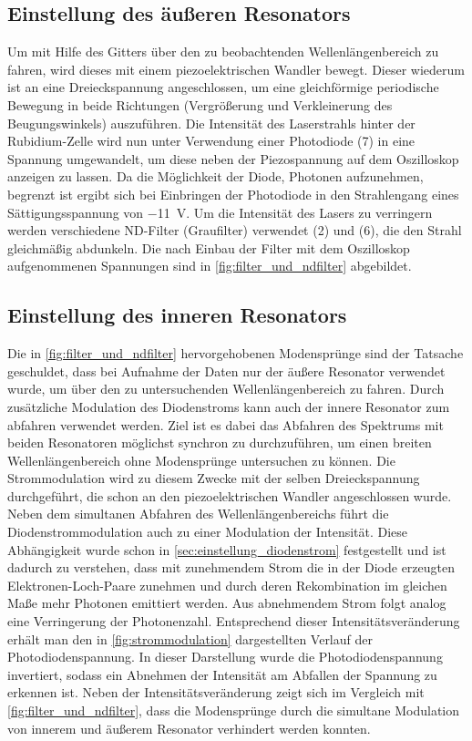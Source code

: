 \subsection{Einstellung des äußeren Resonators}
Um mit Hilfe des Gitters über den zu beobachtenden Wellenlängenbereich zu fahren, wird dieses
mit einem piezoelektrischen Wandler bewegt. Dieser wiederum ist an eine Dreieckspannung angeschlossen,
um eine gleichförmige periodische Bewegung in beide Richtungen (Vergrößerung und Verkleinerung des Beugungswinkels)
auszuführen. 
Die Intensität des Laserstrahls hinter der Rubidium-Zelle wird nun unter Verwendung 
einer Photodiode (7) in eine Spannung 
umgewandelt, um diese neben der Piezospannung auf dem Oszilloskop anzeigen zu lassen. 
Da die Möglichkeit der Diode, Photonen aufzunehmen, begrenzt ist ergibt sich bei Einbringen
der Photodiode in den Strahlengang eines Sättigungsspannung von \SI{-11}{\volt}.
Um die Intensität des Lasers zu verringern werden verschiedene ND-Filter (Graufilter) verwendet
(2) und (6), die den Strahl gleichmäßig abdunkeln. 
Die nach Einbau der Filter mit dem Oszilloskop aufgenommenen Spannungen sind in \cref{fig:filter_und_ndfilter}
abgebildet.

 

\subsection{Einstellung des inneren Resonators} \label{sec:innerer_resonator}
Die in \cref{fig:filter_und_ndfilter} hervorgehobenen Modensprünge sind der Tatsache geschuldet,
dass bei Aufnahme der Daten nur der äußere Resonator verwendet wurde, um über den zu untersuchenden
Wellenlängenbereich zu fahren. Durch zusätzliche Modulation des Diodenstroms kann auch der innere 
Resonator zum abfahren verwendet werden. Ziel ist es dabei das Abfahren des Spektrums mit beiden 
Resonatoren möglichst synchron zu durchzuführen, um einen breiten Wellenlängenbereich ohne 
Modensprünge untersuchen zu können. Die Strommodulation wird zu diesem Zwecke mit der 
selben Dreieckspannung durchgeführt, die schon an den piezoelektrischen Wandler angeschlossen wurde.
Neben dem simultanen Abfahren des Wellenlängenbereichs führt die Diodenstrommodulation auch zu 
einer Modulation der Intensität. Diese Abhängigkeit wurde schon in \cref{sec:einstellung_diodenstrom} 
festgestellt und ist dadurch zu verstehen, dass mit zunehmendem Strom die in der Diode erzeugten 
Elektronen-Loch-Paare zunehmen und durch deren Rekombination im gleichen Maße mehr Photonen
emittiert werden. Aus abnehmendem Strom folgt analog eine Verringerung der Photonenzahl. 
Entsprechend dieser Intensitätsveränderung erhält man den in \cref{fig:strommodulation} dargestellten
Verlauf der Photodiodenspannung. In dieser Darstellung wurde die Photodiodenspannung invertiert,
sodass ein Abnehmen der Intensität am Abfallen der Spannung zu erkennen ist.
Neben der Intensitätsveränderung zeigt sich im Vergleich mit \cref{fig:filter_und_ndfilter},
dass die Modensprünge durch die simultane Modulation von innerem und äußerem Resonator verhindert
werden konnten.

